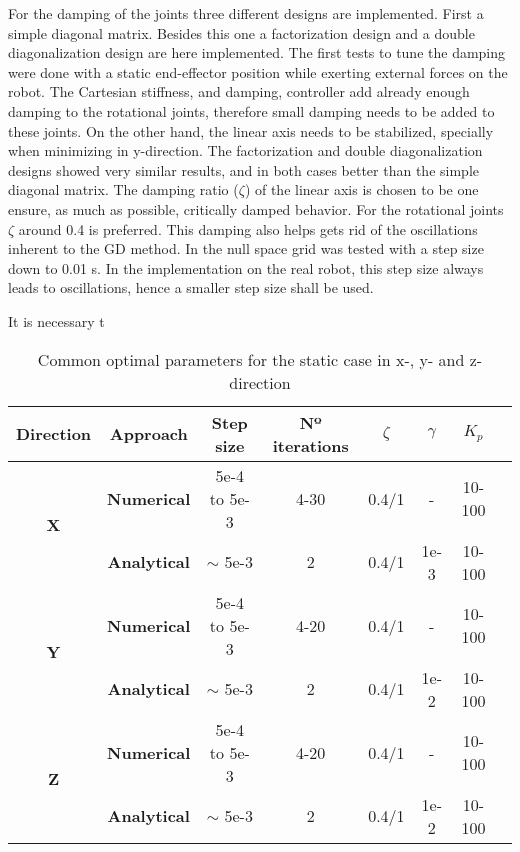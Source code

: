 For the damping of the joints three different designs are implemented. First a simple diagonal matrix. Besides this one a factorization design and a double diagonalization design \cite{alin_damping} are here implemented. The first tests to tune the damping were  done with a static end-effector position while exerting external forces on the robot. The Cartesian stiffness, and damping, controller add already enough damping to the rotational joints, therefore small damping needs to be added to these joints. On the other hand, the linear axis needs to be stabilized, specially when minimizing in y-direction. The factorization and double diagonalization designs showed very similar results, and in both cases better than the simple diagonal matrix. The  damping ratio ($\zeta$) of the linear axis is chosen to be one ensure, as much as possible, critically damped behavior. For the rotational joints $\zeta$ around 0.4 is preferred.
This damping also helps gets rid of the oscillations inherent to the GD method.
In \cite{fabianthesis} the null space grid was tested with a step size down to 0.01 s. In the  implementation on the real robot,  this step size  always leads to oscillations, hence  a smaller step size shall be used.






\begin{table}[]It is necessary t
	\centering
	\caption{Common optimal parameters for the static case in x-, y- and z-direction}
	\label{table:table_SC}
	\begin{tabular}{|c|c|c|c|c|c|c|c|}
		\hline
		\textbf{Direction}          & \textbf{Approach}   & \textbf{Step size} & \textbf{Nº iterations} & \textbf{$\zeta$} & \textbf{$\gamma$} & \textbf{$K_p$}  \\ \hline
		\multirow{2}{*}{\textbf{X}} & \textbf{Numerical}  & 5e-4 to 5e-3       & 4-30                          & 0.4/1                   & -             & 10-100                    \\ 
		& \textbf{Analytical} & $\sim$ 5e-3       & 2                             & 0.4/1                   & 1e-3       & 10-100                          \\ \hline
		\multirow{2}{*}{\textbf{Y}} & \textbf{Numerical}  & 5e-4 to 5e-3       & 4-20                          & 0.4/1                  & -                    & 10-100               \\ 
		& \textbf{Analytical} & $\sim$ 5e-3       & 2                             & 0.4/1                  & 1e-2        & 10-100                        \\ \hline
		\multirow{2}{*}{\textbf{Z}} & \textbf{Numerical}  & 5e-4 to 5e-3       & 4-20                          & 0.4/1                   & -                         & 10-100           \\ 
		& \textbf{Analytical} & $\sim$ 5e-3       & 2                             & 0.4/1                  & 1e-2      & 10-100         \\ \hline                 
	\end{tabular}
\end{table}







